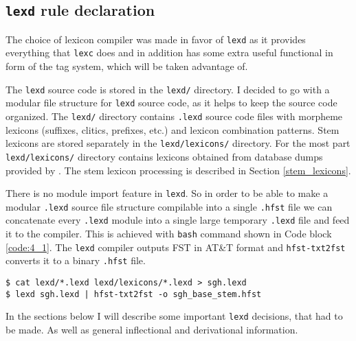 \subsection{\texttt{lexd} rule declaration} \label{lexd_sec}
The choice of lexicon compiler was made in favor of \texttt{lexd} as it provides everything that \texttt{lexc} does and in addition has some extra useful functional in form of the tag system, which will be taken advantage of. 

The \texttt{lexd} source code is stored in the \texttt{lexd/} directory. I decided to go with a modular file structure for \texttt{lexd} source code, as it helps to keep the source code organized. The \texttt{lexd/} directory contains \texttt{.lexd} source code files with morpheme lexicons (suffixes, clitics, prefixes, etc.) and lexicon combination patterns. Stem lexicons are stored separately in the \texttt{lexd/lexicons/} directory. For the most part \texttt{lexd/lexicons/} directory contains lexicons obtained from database dumps provided by \textcite{makarov_digital_2022}. The stem lexicon processing is described in Section \ref{stem_lexicons}.

There is no module import feature in \texttt{lexd}. So in order to be able to make a modular \texttt{.lexd} source file structure compilable into a single \texttt{.hfst} file we can concatenate every \texttt{.lexd} module into a single large temporary \texttt{.lexd} file and feed it to the compiler. This is achieved with \texttt{bash} command shown in Code block \ref{code:4_1}. The \texttt{lexd} compiler outputs FST in AT\&T format and \texttt{hfst-txt2fst} converts it to a binary \texttt{.hfst} file.

\begin{code_frame}[float]
    \begin{footnotesize}\codespacing
    \begin{verbatim}
$ cat lexd/*.lexd lexd/lexicons/*.lexd > sgh.lexd
$ lexd sgh.lexd | hfst-txt2fst -o sgh_base_stem.hfst
    \end{verbatim}
    \end{footnotesize}
    \tcblower
    \label{code:4_1}
\end{code_frame}

In the sections below I will describe some important \texttt{lexd} decisions, that had to be made. As well as general inflectional and derivational information.
\FloatBarrier

